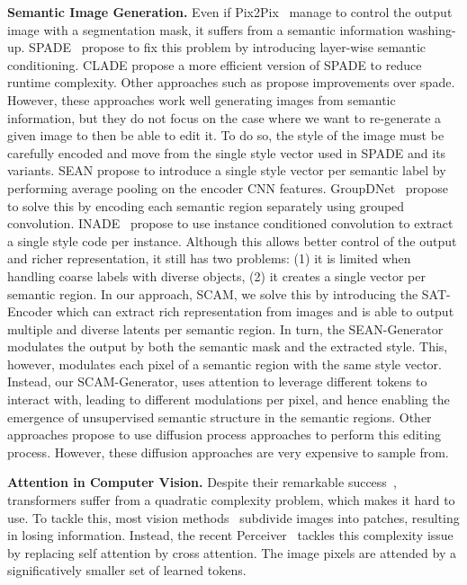 \documentclass[runningheads]{llncs}
\makeatletter
\newcommand{\mname}{SCAM\@\xspace}
\makeatother
\begin{document}
\noindent \textbf{Semantic Image Generation.} Even if Pix2Pix~\cite{isola2018imagetoimage,wang2018pix2pixHD} manage to control the output image with a segmentation mask, it suffers from a semantic information washing-up. SPADE~\cite{park2019semantic} propose to fix this problem by introducing layer-wise semantic conditioning. CLADE\cite{tan2021efficient} propose a more efficient version of SPADE to reduce runtime complexity. Other approaches such as \cite{wang2021image,liu2019learning,li2021collaging,sushko2021need,tang2020local,tan2021efficient,endo2020diversifying,gu2019mask} propose improvements over spade. However, these approaches work well generating images from semantic information, but they do not focus on the case where we want to re-generate a given image to then be able to edit it. To do so, the style of the image must be carefully encoded and move from the single style vector used in SPADE and its variants. SEAN\cite{Zhu_2020} propose to introduce a single style vector per semantic label by performing average pooling on the encoder CNN features. GroupDNet~\cite{zhu2020semantically} propose to solve this by encoding each semantic region separately using grouped convolution. INADE~\cite{tan2021diverse} propose to use instance conditioned convolution to extract a single style code per instance. Although this allows better control of the output and richer representation, it still has two problems: 
(1) it is limited when handling coarse labels with diverse objects, (2) it creates a single vector per semantic region. 
In our approach, \mname, we solve this by introducing the SAT-Encoder which can extract rich representation from images and is able to output multiple and diverse latents per semantic region.
In turn, the SEAN-Generator modulates the output by both the semantic mask and the extracted style. This, however, modulates each pixel of a semantic region with the same style vector. 
Instead, our SCAM-Generator, uses attention to leverage different tokens to interact with, leading to different modulations per pixel, and hence enabling the emergence of unsupervised semantic structure in the semantic regions.
Other approaches propose to use diffusion process approaches \cite{meng2022sdedit} to perform this editing process. However, these diffusion approaches are very expensive to sample from.








\noindent \textbf{Attention in Computer Vision.} Despite their remarkable success~\cite{devlin2019bert,radford2018improving,radford2019language,brown2020language}, transformers suffer from a quadratic complexity problem, which makes it hard to use. To tackle this, most vision methods~\cite{dosovitskiy2021image,touvron2021training,liu2021swin} subdivide  images into patches, resulting in losing information. Instead, the recent Perceiver~\cite{jaegle2021perceiver,jaegle2021perceiverio} tackles this complexity issue by replacing self attention by cross attention. 
The image pixels are attended by a significatively smaller set of learned tokens.
\end{document}

